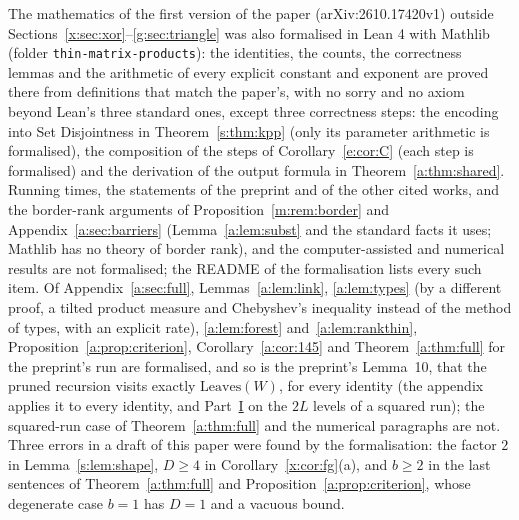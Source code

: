 \documentclass[11pt]{article}
\theoremstyle{definition}
\theoremstyle{remark}
\newcommand{\Leaves}{\mathrm{Leaves}}
\begin{document}
The mathematics of the first version of the paper (arXiv:2610.17420v1) outside Sections~\ref{x:sec:xor}--\ref{g:sec:triangle} was also formalised in Lean 4 with Mathlib (folder \texttt{thin-matrix-products}): the identities, the counts, the correctness lemmas and the arithmetic of every explicit constant and exponent are proved there from definitions that match the paper's, with no sorry and no axiom beyond Lean's three standard ones, except three correctness steps: the encoding into Set Disjointness in Theorem~\ref{s:thm:kpp} (only its parameter arithmetic is formalised), the composition of the steps of Corollary~\ref{e:cor:C} (each step is formalised) and the derivation of the output formula in Theorem~\ref{a:thm:shared}. Running times, the statements of the preprint and of the other cited works, and the border-rank arguments of Proposition~\ref{m:rem:border} and Appendix~\ref{a:sec:barriers} (Lemma~\ref{a:lem:subst} and the standard facts it uses; Mathlib has no theory of border rank), and the computer-assisted and numerical results are not formalised; the README of the formalisation lists every such item. Of Appendix~\ref{a:sec:full}, Lemmas~\ref{a:lem:link}, \ref{a:lem:types} (by a different proof, a tilted product measure and Chebyshev's inequality instead of the method of types, with an explicit rate), \ref{a:lem:forest} and~\ref{a:lem:rankthin}, Proposition~\ref{a:prop:criterion}, Corollary~\ref{a:cor:145} and Theorem~\ref{a:thm:full} for the preprint's run are formalised, and so is the preprint's Lemma~10, that the pruned recursion visits exactly $\Leaves(W)$, for every identity (the appendix applies it to every identity, and Part~\hyperref[m:partI]{I} on the $2L$ levels of a squared run); the squared-run case of Theorem~\ref{a:thm:full} and the numerical paragraphs are not. Three errors in a draft of this paper were found by the formalisation: the factor $2$ in Lemma~\ref{s:lem:shape}, $D\ge4$ in Corollary~\ref{x:cor:fg}(a), and $b\ge2$ in the last sentences of Theorem~\ref{a:thm:full} and Proposition~\ref{a:prop:criterion}, whose degenerate case $b=1$ has $D=1$ and a vacuous bound.
\end{document}
